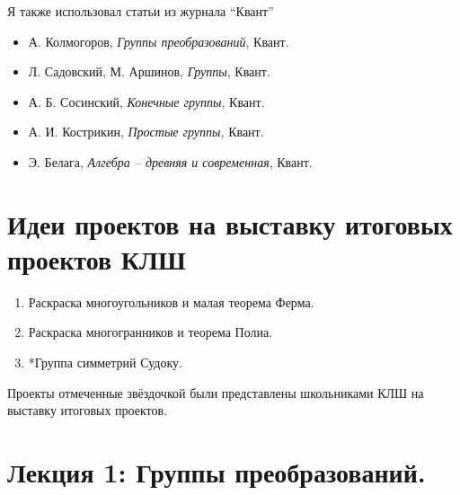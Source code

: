 \documentclass[amsmath,amssymb,12pt]{revtex4}
\newcommand{\1}{\frac{1}{2}}
\begin{document}
Я также использовал статьи из журнала ``Квант''
\begin{itemize}
	\item А. Колмогоров, \textit{Группы преобразований}, Квант. 
	\item Л. Садовский, М. Аршинов, \textit{Группы}, Квант. 
	\item А. Б. Сосинский, \textit{Конечные группы}, Квант. 
	\item А. И. Кострикин, \textit{Простые группы}, Квант. 
	\item Э. Белага, \textit{Алгебра -- древняя и современная}, Квант.
\end{itemize}

\section*{\large Идеи проектов на выставку итоговых проектов  КЛШ}
\setcounter{prn}{0}


\begin{enumerate}
	\item Раскраска многоугольников и малая теорема Ферма.
	\item Раскраска многогранников и теорема Полиа.
	\item *Группа симметрий Судоку.
\end{enumerate}
Проекты отмеченные звёздочкой были представлены школьниками КЛШ на выставку итоговых проектов.




\newpage
\section*{\large Лекция 1: Группы преобразований.}
\setcounter{prn}{0}
\end{document}
